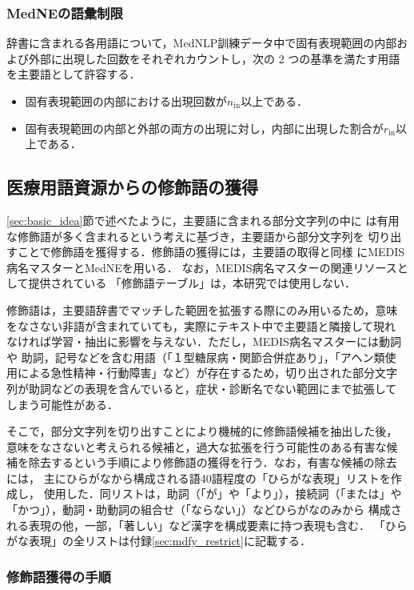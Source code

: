 \documentclass[japanese]{jnlp_1.4}
\begin{document}
\subsubsection*{MedNEの語彙制限}

辞書に含まれる各用語について，MedNLP訓練データ中で固有表現範囲の内部お
よび外部に出現した回数をそれぞれカウントし，次の 2 つの基準を満たす用語
を主要語として許容する．
\begin{itemize}
\item 固有表現範囲の内部における出現回数が$n_\mathrm{in}$以上である．
\item 固有表現範囲の内部と外部の両方の出現に対し，内部に出現した割合が$r_\mathrm{in}$以上である．
\end{itemize}


\subsection{医療用語資源からの修飾語の獲得}
\label{sec:gen_mdfydic}

\ref{sec:basic_idea}節で述べたように，主要語に含まれる部分文字列の中に
は有用な修飾語が多く含まれるという考えに基づき，主要語から部分文字列を
切り出すことで修飾語を獲得する．修飾語の獲得には，主要語の取得と同様
にMEDIS病名マスターとMedNEを用いる．
なお，MEDIS病名マスターの関連リソースとして提供されている
「修飾語テーブル」は，本研究では使用しない．

修飾語は，主要語辞書でマッチした範囲を拡張する際にのみ用いるため，意味
をなさない非語が含まれていても，実際にテキスト中で主要語と隣接して現れ
なければ学習・抽出に影響を与えない．ただし，MEDIS病名マスターには動詞や
助詞，記号などを含む用語（「１型糖尿病・関節合併症あり」，「アヘン類使
用による急性精神・行動障害」など）が存在するため，切り出された部分文字
列が助詞などの表現を含んでいると，症状・診断名でない範囲にまで拡張して
しまう可能性がある．

そこで，部分文字列を切り出すことにより機械的に修飾語候補を抽出した後，
意味をなさないと考えられる候補と，過大な拡張を行う可能性のある有害な候
補を除去するという手順により修飾語の獲得を行う．なお，有害な候補の除去
には，
主にひらがなから構成される語40語程度の「ひらがな表現」リストを作成し，
使用した．同リストは，助詞（「が」や「より」），接続詞（「または」や
「かつ」），動詞・助動詞の組合せ（「ならない」）などひらがなのみから
構成される表現の他，一部，「著しい」など漢字を構成要素に持つ表現も含む．
「ひらがな表現」の全リストは付録\ref{sec:mdfy_restrict}に記載する．


\subsubsection*{修飾語獲得の手順}
\end{document}
